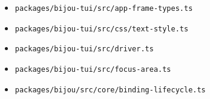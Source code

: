 \begin{itemize}
\tightlist
\item
  \texttt{p\allowbreak{}a\allowbreak{}c\allowbreak{}k\allowbreak{}a\allowbreak{}g\allowbreak{}e\allowbreak{}s\allowbreak{}/\allowbreak{}b\allowbreak{}i\allowbreak{}j\allowbreak{}o\allowbreak{}u\allowbreak{}-\allowbreak{}t\allowbreak{}u\allowbreak{}i\allowbreak{}/\allowbreak{}s\allowbreak{}r\allowbreak{}c\allowbreak{}/\allowbreak{}a\allowbreak{}p\allowbreak{}p\allowbreak{}-\allowbreak{}f\allowbreak{}r\allowbreak{}a\allowbreak{}m\allowbreak{}e\allowbreak{}-\allowbreak{}t\allowbreak{}y\allowbreak{}p\allowbreak{}e\allowbreak{}s\allowbreak{}.\allowbreak{}t\allowbreak{}s}
\item
  \texttt{p\allowbreak{}a\allowbreak{}c\allowbreak{}k\allowbreak{}a\allowbreak{}g\allowbreak{}e\allowbreak{}s\allowbreak{}/\allowbreak{}b\allowbreak{}i\allowbreak{}j\allowbreak{}o\allowbreak{}u\allowbreak{}-\allowbreak{}t\allowbreak{}u\allowbreak{}i\allowbreak{}/\allowbreak{}s\allowbreak{}r\allowbreak{}c\allowbreak{}/\allowbreak{}c\allowbreak{}s\allowbreak{}s\allowbreak{}/\allowbreak{}t\allowbreak{}e\allowbreak{}x\allowbreak{}t\allowbreak{}-\allowbreak{}s\allowbreak{}t\allowbreak{}y\allowbreak{}l\allowbreak{}e\allowbreak{}.\allowbreak{}t\allowbreak{}s}
\item
  \texttt{p\allowbreak{}a\allowbreak{}c\allowbreak{}k\allowbreak{}a\allowbreak{}g\allowbreak{}e\allowbreak{}s\allowbreak{}/\allowbreak{}b\allowbreak{}i\allowbreak{}j\allowbreak{}o\allowbreak{}u\allowbreak{}-\allowbreak{}t\allowbreak{}u\allowbreak{}i\allowbreak{}/\allowbreak{}s\allowbreak{}r\allowbreak{}c\allowbreak{}/\allowbreak{}d\allowbreak{}r\allowbreak{}i\allowbreak{}v\allowbreak{}e\allowbreak{}r\allowbreak{}.\allowbreak{}t\allowbreak{}s}
\item
  \texttt{p\allowbreak{}a\allowbreak{}c\allowbreak{}k\allowbreak{}a\allowbreak{}g\allowbreak{}e\allowbreak{}s\allowbreak{}/\allowbreak{}b\allowbreak{}i\allowbreak{}j\allowbreak{}o\allowbreak{}u\allowbreak{}-\allowbreak{}t\allowbreak{}u\allowbreak{}i\allowbreak{}/\allowbreak{}s\allowbreak{}r\allowbreak{}c\allowbreak{}/\allowbreak{}f\allowbreak{}o\allowbreak{}c\allowbreak{}u\allowbreak{}s\allowbreak{}-\allowbreak{}a\allowbreak{}r\allowbreak{}e\allowbreak{}a\allowbreak{}.\allowbreak{}t\allowbreak{}s}
\item
  \texttt{p\allowbreak{}a\allowbreak{}c\allowbreak{}k\allowbreak{}a\allowbreak{}g\allowbreak{}e\allowbreak{}s\allowbreak{}/\allowbreak{}b\allowbreak{}i\allowbreak{}j\allowbreak{}o\allowbreak{}u\allowbreak{}/\allowbreak{}s\allowbreak{}r\allowbreak{}c\allowbreak{}/\allowbreak{}c\allowbreak{}o\allowbreak{}r\allowbreak{}e\allowbreak{}/\allowbreak{}b\allowbreak{}i\allowbreak{}n\allowbreak{}d\allowbreak{}i\allowbreak{}n\allowbreak{}g\allowbreak{}-\allowbreak{}l\allowbreak{}i\allowbreak{}f\allowbreak{}e\allowbreak{}c\allowbreak{}y\allowbreak{}c\allowbreak{}l\allowbreak{}e\allowbreak{}.\allowbreak{}t\allowbreak{}s}

\end{itemize}
